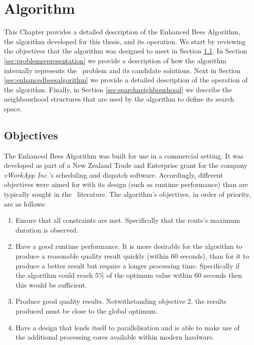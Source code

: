 
\chapter{Algorithm}
\label{chap:algorithm}

This Chapter provides a detailed description of the Enhanced Bees Algorithm, the algorithm developed for this thesis, and its operation. We start by reviewing the objectives that the algorithm was designed to meet in Section \ref{sec:objectives}. In Section \ref{sec:problemrepresentation} we provide a description of how the algorithm internally represents the \VRP\ problem and its candidate solutions. Next in Section \ref{sec:enhancedbeesalgorithm} we provide a detailed description of the operation of the algorithm. Finally, in Section \ref{sec:searchneighbourhood} we describe the neighbourhood structures that are used by the algorithm to define its search space.

\section{Objectives}
\label{sec:objectives}

The Enhanced Bees Algorithm was built for use in a commercial setting. It was developed as part of a New Zealand Trade and Enterprise grant for the company \emph{vWorkApp Inc.}'s scheduling and dispatch software. Accordingly, different objectives were aimed for with its design (such as runtime performance) than are typically sought in the \VRP\ literature. The algorithm's objectives, in order of priority, are as follows:

\begin{enumerate}
   \item Ensure that all constraints are met. Specifically that the route's maximum duration is observed. 
   
   \item Have a good runtime performance. It is more desirable for the algorithm to produce a reasonable quality result quickly (within 60 seconds), than for it to produce a better result but require a longer processing time. Specifically if the algorithm could reach 5\% of the optimum value within 60 seconds then this would be sufficient. 

   \item Produce good quality results. Notwithstanding objective 2, the results produced must be close to the global optimum. 
   
   \item Have a design that lends itself to parallelisation and is able to make use of the additional processing cores available within modern hardware.
   
\end{enumerate}

